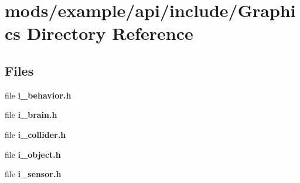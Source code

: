 \section{mods/example/api/include/\+Graphics Directory Reference}
\label{dir_b9210adf299f6cee40af0273ec811ea3}
\subsection*{Files}
\begin{DoxyCompactItemize}
\item 
file {\bfseries i\+\_\+behavior.\+h}
\item 
file {\bfseries i\+\_\+brain.\+h}
\item 
file {\bfseries i\+\_\+collider.\+h}
\item 
file {\bfseries i\+\_\+object.\+h}
\item 
file {\bfseries i\+\_\+sensor.\+h}
\end{DoxyCompactItemize}

